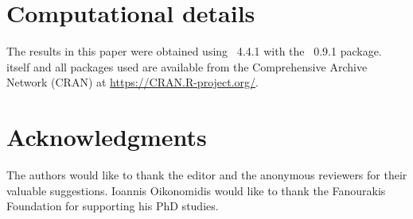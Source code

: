 \documentclass[nojss]{jss}
\begin{document}
\section*{Computational details}

The results in this paper were obtained using
~4.4.1 with the
~0.9.1 package.  itself
and all packages used are available from the Comprehensive
 Archive Network (CRAN) at
\url{https://CRAN.R-project.org/}.

\section*{Acknowledgments}

\begin{leftbar}
The authors would like to thank the editor and the anonymous reviewers for their valuable suggestions. Ioannis Oikonomidis would like to thank the Fanourakis Foundation for supporting his PhD studies.
\end{leftbar}



\end{document}
